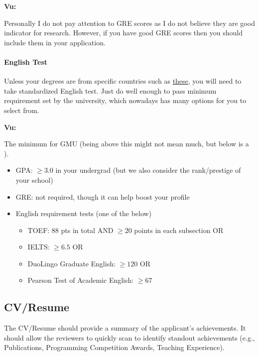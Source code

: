 \documentclass[11pt]{article}
\newenvironment{commentbox}[1][]{
\small
    \begin{cbox}
    \textbf{#1} 
 }{
   \end{cbox}
}
\newcommand{\red}[1]{{\color{red}{#1}}}
\begin{document}
\begin{commentbox}[Vu:]
Personally I do not pay attention to GRE scores as I do not believe they are good indicator for research. However, if you have good GRE scores then you should include them in your application.
\end{commentbox}

\paragraph{English Test} Unless your degrees are from specific countries such as \href{https://github.com/dynaroars/dynaroars.github.io/wiki/About-GMU#standard-tests-waiver-eligible-countries}{these}, you will need to
take standardized English test. Just do well enough to pass minimum requirement set by the university, which nowadays has many options for you to select from.

\begin{commentbox}[Vu:]
The minimum for GMU (being above this might not mean much, but below is a \red{red flag}).
\begin{itemize}
\item GPA: $\ge 3.0$ in your undergrad (but we also consider the rank/prestige of your school)
\item GRE: not required, though it can help boost your profile
\item English requirement tests (one of the below)
  \begin{itemize}    
  \item TOEF: 88 pts in total AND $\ge 20$ points in each subsection OR
  \item IELTS: $\ge 6.5$ OR
  \item DuoLingo Graduate English: $\ge 120$ OR 
  \item Pearson Test of Academic English: $\ge 67$
  \end{itemize}  
\end{itemize}
\end{commentbox}


\subsection{CV/Resume}
The CV/Resume should provide a summary of the applicant's achievements.  It should allow the reviewers to quickly scan to identify standout achievements (e.g., Publications, Programming Competition Awards, Teaching Experience).
\end{document}
